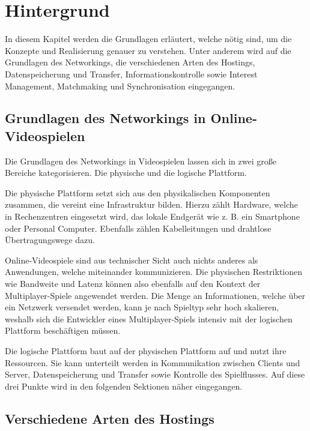 
\chapter{Hintergrund}
\label{sec:hintergrund}

In diesem Kapitel werden die Grundlagen erläutert, welche nötig sind, um die Konzepte und Realisierung genauer zu verstehen. Unter anderem wird auf die Grundlagen des Networkings, die verschiedenen Arten des Hostings, Datenspeicherung und Transfer, Informationskontrolle sowie Interest Management, Matchmaking und Synchronisation eingegangen.

\section{Grundlagen des Networkings in Online-Videospielen}

Die Grundlagen des Networkings in Videospielen lassen sich in zwei große Bereiche kategorisieren. Die physische und die logische Plattform. 

Die physische Plattform setzt sich aus den physikalischen Komponenten zusammen, die vereint eine Infrastruktur bilden. Hierzu zählt Hardware, welche in Rechenzentren eingesetzt wird, das lokale Endgerät wie z. B. ein Smartphone oder Personal Computer. Ebenfalls zählen Kabelleitungen und drahtlose Übertragungswege dazu. 

Online-Videospiele sind aus technischer Sicht auch nichts anderes als Anwendungen, welche miteinander kommunizieren. Die physischen Restriktionen wie Bandweite und Latenz können also ebenfalls auf den Kontext der Multiplayer-Spiele angewendet werden. Die Menge an Informationen, welche über ein Netzwerk versendet werden, kann je nach Spieltyp sehr hoch skalieren, weshalb sich die Entwickler eines Multiplayer-Spiels intensiv mit der logischen Plattform beschäftigen müssen.

Die logische Plattform baut auf der physischen Plattform auf und nutzt ihre Ressourcen. Sie kann unterteilt werden in Kommunikation zwischen Clients und Server, Datenspeicherung und Transfer sowie Kontrolle des Spielflusses. Auf diese drei Punkte wird in den folgenden Sektionen näher eingegangen.

\cite{Smed.2002c}


\section{Verschiedene Arten des Hostings}
\label{arten_des_hostings}

